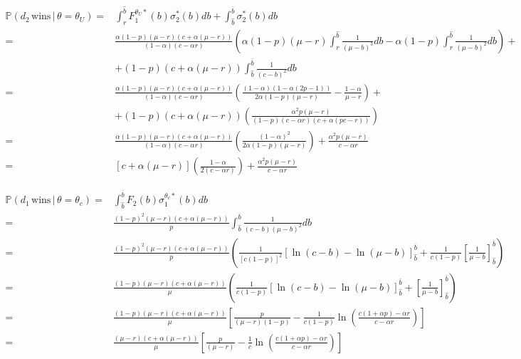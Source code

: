{\footnotesize
\begin{align*}
    \mathbb{P}(d_2 \, \text{wins} \, | \, \theta = \theta_U) = & \int_{r}^{\hat{b}} F_1^{\theta_U *}(b)\sigma_2^*(b) db + \int_{\hat{b}}^{\overline{b}}\sigma_2^*(b)db \\[5pt]
    = & \frac{\alpha(1-p)(\mu-r)(c+\alpha(\mu-r))}{(1-\alpha)(c-\alpha r)} \left( \alpha(1-p)(\mu-r)\int_{r}^{\hat{b}}\frac{1}{(\mu-b)^3}db - \alpha(1-p)\int_{r}^{\hat{b}}\frac{1}{(\mu-b)^2}db\right) + \\[5pt]
    & + (1-p)(c+\alpha(\mu-r))\int_{\hat{b}}^{\overline{b}}\frac{1}{(c-b)^2}db \\[5pt]
    = & \frac{\alpha(1-p)(\mu-r)(c+\alpha(\mu-r))}{(1-\alpha)(c-\alpha r)} \left( \frac{(1-\alpha)(1-\alpha(2p-1))}{2\alpha(1-p)(\mu-r)} - \frac{1-\alpha}{\mu-r}\right) + \\[5pt]
    & + (1-p)(c+\alpha(\mu-r)) \left(\frac{\alpha^2 p (\mu-r)}{(1-p)(c-\alpha r)(c+\alpha (p c -  r))}\right) \\[5pt]
    = & \frac{\alpha(1-p)(\mu-r)(c+\alpha(\mu-r))}{(1-\alpha)(c-\alpha r)} \left( \frac{(1-\alpha)^2}{2\alpha(1-p)(\mu-r)}\right) + \frac{\alpha^2 p (\mu-r)}{c-\alpha r}  \\[5pt]
    = & [c+\alpha(\mu-r)] \left( \frac{1-\alpha}{2(c-\alpha r)}\right) + \frac{\alpha^2 p (\mu-r)}{c-\alpha r}
\end{align*}
}

{\footnotesize
\begin{align*}
    \mathbb{P}(d_1 \, \text{wins} \, | \, \theta = \theta_c) = & \int_{\hat{b}}^{\overline{b}} F_2(b)\sigma_1^{\theta_c *}(b) db \\[5pt]
    = & \frac{(1-p)^2(\mu-r)(c+\alpha(\mu-r))}{p}\int_{\hat{b}}^{\overline{b}} \frac{1}{(c-b)(\mu-b)^2} db \\[5pt]
    = &\frac{(1-p)^2(\mu-r)(c+\alpha(\mu-r))}{p} \left( \frac{1}{[c(1-p)]^2}\left[\ln(c-b) - \ln(\mu-b) \right]^{\overline{b}}_{\hat{b}} + \frac{1}{c(1-p)} \left[\frac{1}{\mu-b} \right]^{\overline{b}}_{\hat{b}} \right) \\[5pt]
    = & \frac{(1-p)(\mu-r)(c+\alpha(\mu-r))}{\mu} \left( \frac{1}{c(1-p)}\left[\ln(c-b) - \ln(\mu-b) \right]^{\overline{b}}_{\hat{b}} + \left[\frac{1}{\mu-b} \right]^{\overline{b}}_{\hat{b}} \right) \\[5pt]
    = & \frac{(1-p)(\mu-r)(c+\alpha(\mu-r))}{\mu} \left[\frac{p}{(\mu-r)(1-p)}- \frac{1}{c(1-p)}\ln \left(\frac{c(1+\alpha p) - \alpha r}{c-\alpha r} \right) \right]
    \\[5pt]
    = & \frac{(\mu-r)(c+\alpha(\mu-r))}{\mu} \left[\frac{p}{(\mu-r)}- \frac{1}{c}\ln \left(\frac{c(1+\alpha p) - \alpha r}{c-\alpha r} \right) \right]
\end{align*}
}

